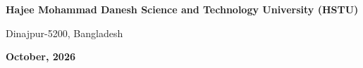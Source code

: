 \begin{titlepage}
\begin{singlespace}
\begin{center}
    {\fontsize{13pt}{16pt}\selectfont \textbf{Hajee Mohammad Danesh Science and Technology University (HSTU)} \par}
    \vspace{0.15cm}
    {\fontsize{11pt}{14pt}\selectfont Dinajpur-5200, Bangladesh \par}
    
    \vspace{0.45cm}
    {\fontsize{12pt}{15pt}\selectfont \textbf{October, 2026} \par}
    
\end{center}
\end{singlespace}
\end{titlepage}

